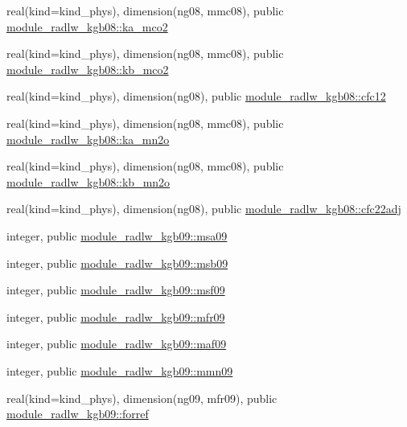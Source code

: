 \begin{DoxyCompactItemize}
\item 
real(kind=kind\+\_\+phys), dimension(ng08, mmc08), public \hyperlink{namespacemodule__radlw__kgb08_a0fcd13503b3253ec6aab0aa52056f634}{module\+\_\+radlw\+\_\+kgb08\+::ka\+\_\+mco2}
\item 
real(kind=kind\+\_\+phys), dimension(ng08, mmc08), public \hyperlink{namespacemodule__radlw__kgb08_a9a85770aee1b88b9323d9466c1772ec4}{module\+\_\+radlw\+\_\+kgb08\+::kb\+\_\+mco2}
\item 
real(kind=kind\+\_\+phys), dimension(ng08), public \hyperlink{namespacemodule__radlw__kgb08_a010239f14788bc1ed9953133e30a62fd}{module\+\_\+radlw\+\_\+kgb08\+::cfc12}
\item 
real(kind=kind\+\_\+phys), dimension(ng08, mmc08), public \hyperlink{namespacemodule__radlw__kgb08_a61949dc331e9a58d4f2a31b625481795}{module\+\_\+radlw\+\_\+kgb08\+::ka\+\_\+mn2o}
\item 
real(kind=kind\+\_\+phys), dimension(ng08, mmc08), public \hyperlink{namespacemodule__radlw__kgb08_a9a8e2f789421acc307e37b03478efb4b}{module\+\_\+radlw\+\_\+kgb08\+::kb\+\_\+mn2o}
\item 
real(kind=kind\+\_\+phys), dimension(ng08), public \hyperlink{namespacemodule__radlw__kgb08_a38a3ce7d8f3db6b732511cf78ef735db}{module\+\_\+radlw\+\_\+kgb08\+::cfc22adj}
\item 
integer, public \hyperlink{namespacemodule__radlw__kgb09_ab739f0acab23f3140067506b396b3717}{module\+\_\+radlw\+\_\+kgb09\+::msa09}
\item 
integer, public \hyperlink{namespacemodule__radlw__kgb09_a7e6bb7acb0df29586d0bd52f3fc41d90}{module\+\_\+radlw\+\_\+kgb09\+::msb09}
\item 
integer, public \hyperlink{namespacemodule__radlw__kgb09_a7d728ef04b3f26c6b20149084334be5a}{module\+\_\+radlw\+\_\+kgb09\+::msf09}
\item 
integer, public \hyperlink{namespacemodule__radlw__kgb09_a777f63022c4f7187446945c6e6ba77e7}{module\+\_\+radlw\+\_\+kgb09\+::mfr09}
\item 
integer, public \hyperlink{namespacemodule__radlw__kgb09_a7d5d565c87af7ef07dc17930f9cb9e57}{module\+\_\+radlw\+\_\+kgb09\+::maf09}
\item 
integer, public \hyperlink{namespacemodule__radlw__kgb09_aa9c8294b56ac3ce90b07114e986777a9}{module\+\_\+radlw\+\_\+kgb09\+::mmn09}
\item 
real(kind=kind\+\_\+phys), dimension(ng09, mfr09), public \hyperlink{namespacemodule__radlw__kgb09_a72a8c0879636dba20e2a8a35ba79f681}{module\+\_\+radlw\+\_\+kgb09\+::forref}

\end{DoxyCompactItemize}
